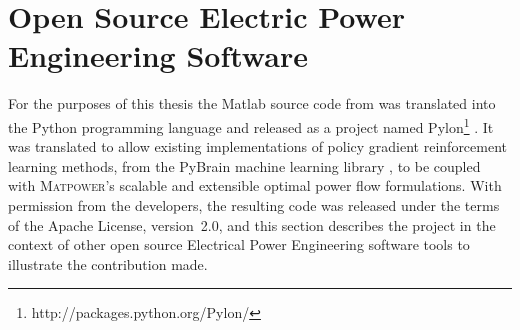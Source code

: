 \chapter{Open Source Electric Power Engineering Software}
\label{sec:oss}
For the purposes of this thesis the Matlab source code from \matpower was
translated into the Python programming language and released as a project named
Pylon\footnote{http://packages.python.org/Pylon/} \cite{lincoln:pyreto}. It was
translated to allow existing implementations of policy gradient reinforcement
learning methods, from the PyBrain machine learning library \cite{schaul:2010},
to be coupled with \textsc{Matpower}'s scalable and extensible optimal power
flow formulations. With permission from the \matpower developers, the resulting
code was released under the terms of the Apache License, version~2.0, and this
section describes the project in the context of other open source Electrical
Power Engineering software tools to illustrate the contribution made.

